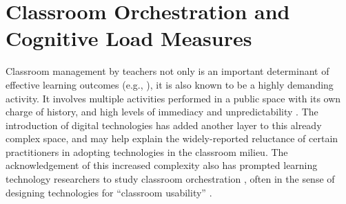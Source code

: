 \documentclass[10pt,journal,compsoc]{IEEEtran}
\begin{document}
%




\section{Classroom Orchestration and Cognitive Load Measures}\label{sec:related}

Classroom management by teachers not only is an important determinant of effective learning outcomes (e.g., \cite{Gomez2013,Onrubia2012}), it is also known to be a highly demanding activity. It involves multiple activities performed in a public space with its own charge of history, and high levels of immediacy and unpredictability \cite{Doyle2006}. The introduction of digital technologies has added another layer to this already complex space, and may help explain the widely-reported reluctance of certain practitioners in adopting technologies in the classroom milieu. The acknowledgement of this increased complexity also has prompted learning technology researchers to study classroom orchestration \cite{Dillenbourg2009, Prieto2011}, often in the sense of designing technologies for ``classroom usability'' \cite{Dillenbourg2011}.
\end{document}
